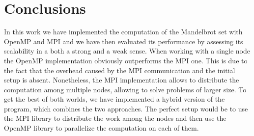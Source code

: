     


\newpage
\section{Conclusions}
    In this work we have implemented the computation of the Mandelbrot set
    with OpenMP and MPI and we have then evaluated its performance by
    assessing its scalability in a both a strong and a weak sense. 
    When working with a single node the OpenMP implementation obviously
    outperforms the MPI one. This is due to the fact that the overhead
    caused by the MPI communication and the initial setup is absent. 
    Nonetheless, the MPI implementation allows to distribute the computation
    among multiple nodes, allowing to solve problems of larger size.
    To get the best of both worlds, we have implemented a hybrid
    version of the program, which combines the two approaches. The perfect
    setup would be to use the MPI library to distribute the work among the
    nodes and then use the OpenMP library to parallelize the computation
    on each of them.

